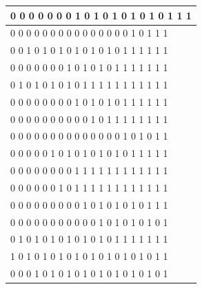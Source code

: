 \documentclass[11pt, a4paper]{article}
\begin{document}
\begin{enumerate}
\begin{table}[http]
\begin{tabular}{|l|}
			0     0     0     0     0     0     0     1     0     1     0     1     0     1     0     1     0     1     1     1 \\ \hline
			0     0     0     0     0     0     0     0     0     0     0     0     0     0     0     1     0     1     1     1 \\ \hline
			0     0     1     0     1     0     1     0     1     0     1     0     1     0     1     1     1     1     1     1 \\ \hline
			0     0     0     0     0     0     0     1     0     1     0     1     0     1     1     1     1     1     1     1 \\ \hline
			0     1     0     1     0     1     0     1     0     1     1     1     1     1     1     1     1     1     1     1 \\ \hline
			0     0     0     0     0     0     0     0     1     0     1     0     1     0     1     1     1     1     1     1 \\ \hline
			0     0     0     0     0     0     0     0     0     0     1     0     1     1     1     1     1     1     1     1 \\ \hline
			0     0     0     0     0     0     0     0     0     0     0     0     0     0     1     0     1     0     1     1 \\ \hline
			0     0     0     0     0     1     0     1     0     1     0     1     0     1     0     1     1     1     1     1 \\ \hline
			0     0     0     0     0     0     0     0     1     1     1     1     1     1     1     1     1     1     1     1 \\ \hline
			0     0     0     0     0     0     1     0     1     1     1     1     1     1     1     1     1     1     1     1 \\ \hline
			0     0     0     0     0     0     0     0     0     1     0     1     0     1     0     1     0     1     1     1 \\ \hline
			0     0     0     0     0     0     0     0     0     0     0     1     0     1     0     1     0     1     0     1 \\ \hline
			0     1     0     1     0     1     0     1     0     1     0     1     0     1     1     1     1     1     1     1 \\ \hline
			1     0     1     0     1     0     1     0     1     0     1     0     1     0     1     0     1     0     1     1 \\ \hline
			0     0     0     1     0     1     0     1     0     1     0     1     0     1     0     1     0     1     0     1 \\ \hline

\end{tabular}
\end{table}
\end{enumerate}
\end{document}

